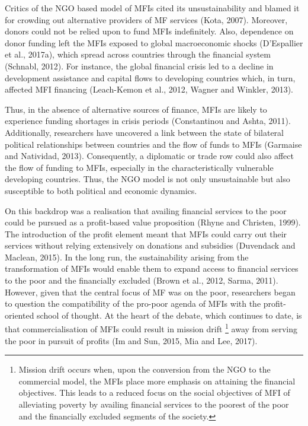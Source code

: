 \documentclass[a4paper, nobind]{templates/ociamthesis}
\begin{document}
\noindent Critics of the NGO based model of MFIs cited its unsustainability and blamed it for crowding out alternative providers of MF services (Kota, 2007). Moreover, donors could not be relied upon to fund MFIs indefinitely. Also, dependence on donor funding left the MFIs exposed to global macroeconomic shocks (D'Espallier et al., 2017a), which spread across countries through the financial system (Schnabl, 2012). For instance, the global financial crisis led to a decline in development assistance and capital flows to developing countries which, in turn, affected MFI financing (Leach-Kemon et al., 2012, Wagner and Winkler, 2013).

Thus, in the absence of alternative sources of finance, MFIs are likely to experience funding shortages in crisis periods (Constantinou and Ashta, 2011). Additionally, researchers have uncovered a link between the state of bilateral political relationships between countries and the flow of funds to MFIs (Garmaise and Natividad, 2013). Consequently, a diplomatic or trade row could also affect the flow of funding to MFIs, especially in the characteristically vulnerable developing countries. Thus, the NGO model is not only unsustainable but also susceptible to both political and economic dynamics.

On this backdrop was a realisation that availing financial services to the poor could be pursued as a profit-based value proposition (Rhyne and Christen, 1999). The introduction of the profit element meant that MFIs could carry out their services without relying extensively on donations and subsidies (Duvendack and Maclean, 2015). In the long run, the sustainability arising from the transformation of MFIs would enable them to expand access to financial services to the poor and the financially excluded (Brown et al., 2012, Sarma, 2011). However, given that the central focus of MF was on the poor, researchers began to question the compatibility of the pro-poor agenda of MFIs with the profit-oriented school of thought. At the heart of the debate, which continues to date, is that commercialisation of MFIs could result in mission drift \footnote{Mission drift occurs when, upon the conversion from the NGO to the commercial model, the MFIs place more emphasis on attaining the financial objectives. This leads to a reduced focus on the social objectives of MFI of alleviating poverty by availing financial services to the poorest of the poor and the financially excluded segments of the society.} away from serving the poor in pursuit of profits (Im and Sun, 2015, Mia and Lee, 2017).
\end{document}
